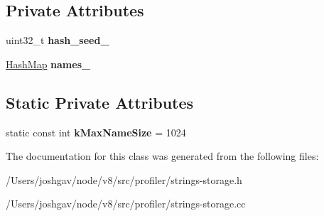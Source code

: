 \subsection*{Private Attributes}
\begin{DoxyCompactItemize}
\item 
uint32\+\_\+t {\bfseries hash\+\_\+seed\+\_\+}\hypertarget{classv8_1_1internal_1_1_strings_storage_a6d99e0d671a5d4953a5ed90124df79ba}{}\label{classv8_1_1internal_1_1_strings_storage_a6d99e0d671a5d4953a5ed90124df79ba}

\item 
\hyperlink{classv8_1_1internal_1_1_template_hash_map_impl}{Hash\+Map} {\bfseries names\+\_\+}\hypertarget{classv8_1_1internal_1_1_strings_storage_aee5fe57a366b02c9f4515592f61e50a1}{}\label{classv8_1_1internal_1_1_strings_storage_aee5fe57a366b02c9f4515592f61e50a1}

\end{DoxyCompactItemize}
\subsection*{Static Private Attributes}
\begin{DoxyCompactItemize}
\item 
static const int {\bfseries k\+Max\+Name\+Size} = 1024\hypertarget{classv8_1_1internal_1_1_strings_storage_abc9ec92cb2acb2af6511804d9a3889a9}{}\label{classv8_1_1internal_1_1_strings_storage_abc9ec92cb2acb2af6511804d9a3889a9}

\end{DoxyCompactItemize}


The documentation for this class was generated from the following files\+:\begin{DoxyCompactItemize}
\item 
/\+Users/joshgav/node/v8/src/profiler/strings-\/storage.\+h\item 
/\+Users/joshgav/node/v8/src/profiler/strings-\/storage.\+cc\end{DoxyCompactItemize}
